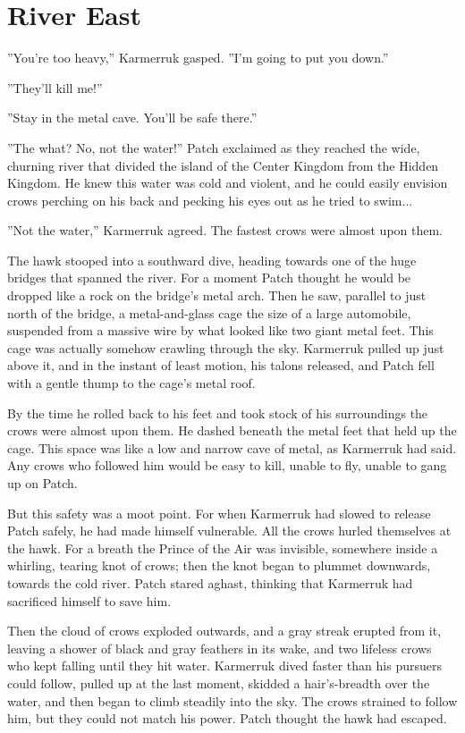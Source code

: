 \documentclass[12pt]{book}
\begin{document}

\section{River East}

''You're too heavy,'' Karmerruk gasped. ''I'm going to put you down.''

''They'll kill me!''

''Stay in the metal cave. You'll be safe there.''

''The what? No, not the water!'' Patch exclaimed as they reached the wide, churning river that divided the island of the Center Kingdom from the Hidden Kingdom. He knew this water was cold and violent, and he could easily envision crows perching on his back and pecking his eyes out as he tried to swim...

''Not the water,'' Karmerruk agreed. The fastest crows were almost upon them.

The hawk stooped into a southward dive, heading towards one of the huge bridges that spanned the river. For a moment Patch thought he would be dropped like a rock on the bridge's metal arch. Then he saw, parallel to just north of the bridge, a metal-and-glass cage the size of a large automobile, suspended from a massive wire by what looked like two giant metal feet. This cage was actually somehow crawling through the sky. Karmerruk pulled up just above it, and in the instant of least motion, his talons released, and Patch fell with a gentle thump to the cage's metal roof.

By the time he rolled back to his feet and took stock of his surroundings the crows were almost upon them. He dashed beneath the metal feet that held up the cage. This space was like a low and narrow cave of metal, as Karmerruk had said. Any crows who followed him would be easy to kill, unable to fly, unable to gang up on Patch.

But this safety was a moot point. For when Karmerruk had slowed to release Patch safely, he had made himself vulnerable. All the crows hurled themselves at the hawk. For a breath the Prince of the Air was invisible, somewhere inside a whirling, tearing knot of crows; then the knot began to plummet downwards, towards the cold river. Patch stared aghast, thinking that Karmerruk had sacrificed himself to save him.

Then the cloud of crows exploded outwards, and a gray streak erupted from it, leaving a shower of black and gray feathers in its wake, and two lifeless crows who kept falling until they hit water. Karmerruk dived faster than his pursuers could follow, pulled up at the last moment, skidded a hair's-breadth over the water, and then began to climb steadily into the sky. The crows strained to follow him, but they could not match his power. Patch thought the hawk had escaped.
\end{document}
